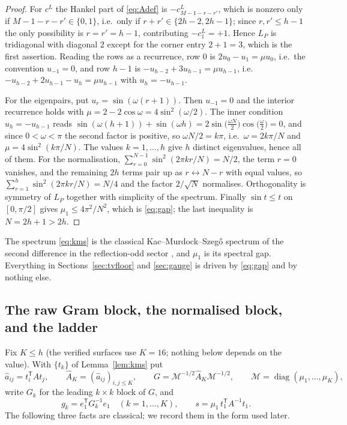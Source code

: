 \documentclass[11pt,a4paper]{article}
\theoremstyle{plain}
\theoremstyle{definition}
\newcommand{\T}{\mathsf{T}}
\newcommand{\Ah}{\widehat{A}}
\newcommand{\ah}{\widehat{a}}
\newcommand{\MM}{\mathcal{M}}
\DeclareMathOperator{\diag}{diag}
\begin{document}
\begin{proof}
For $c^{L}$ the Hankel part of \eqref{eq:Adef} is
$-c^{L}_{M-1-r-r'}$, which is nonzero only if $M-1-r-r'\in\{0,1\}$, i.e.\ only
if $r+r'\in\{2h-2,2h-1\}$; since $r,r'\le h-1$ the only possibility is
$r=r'=h-1$, contributing $-c^{L}_1=+1$. Hence $L_P$ is tridiagonal with
diagonal $2$ except for the corner entry $2+1=3$, which is the first assertion.
Reading the rows as a recurrence, row $0$ is $2u_0-u_1=\mu u_0$, i.e.\ the
convention $u_{-1}=0$, and row $h-1$ is $-u_{h-2}+3u_{h-1}=\mu u_{h-1}$, i.e.\
$-u_{h-2}+2u_{h-1}-u_h=\mu u_{h-1}$ with $u_h=-u_{h-1}$.

For the eigenpairs, put $u_r=\sin(\omega(r+1))$. Then $u_{-1}=0$ and the
interior recurrence holds with $\mu=2-2\cos\omega=4\sin^{2}(\omega/2)$. The
inner condition $u_h=-u_{h-1}$ reads
$\sin(\omega(h+1))+\sin(\omega h)=2\sin\bigl(\tfrac{\omega N}2\bigr)
\cos\bigl(\tfrac\omega2\bigr)=0$, and since $0<\omega<\pi$ the second factor is
positive, so $\omega N/2=k\pi$, i.e.\ $\omega=2k\pi/N$ and
$\mu=4\sin^{2}(k\pi/N)$. The values $k=1,\dots,h$ give $h$ distinct eigenvalues,
hence all of them. For the normalisation,
$\sum_{r=0}^{N-1}\sin^{2}(2\pi kr/N)=N/2$, the term $r=0$ vanishes, and the
remaining $2h$ terms pair up as $r\leftrightarrow N-r$ with equal values, so
$\sum_{r=1}^{h}\sin^{2}(2\pi kr/N)=N/4$ and the factor $2/\sqrt N$ normalises.
Orthogonality is symmetry of $L_P$ together with simplicity of the spectrum.
Finally $\sin t\le t$ on $[0,\pi/2]$ gives
$\mu_1\le4\pi^{2}/N^{2}$, which is \eqref{eq:gap}; the last inequality is
$N=2h+1>2h$.
\end{proof}

The spectrum \eqref{eq:kms} is the classical Kac--Murdock--Szeg\H{o} spectrum of
the second difference in the reflection-odd sector \cite{KMS1953}, and $\mu_1$
is its spectral gap. Everything in Sections~\ref{sec:tvfloor} and
\ref{sec:gauge} is driven by \eqref{eq:gap} and by nothing else.

\subsection{The raw Gram block, the normalised block, and the ladder}
\label{sec:gram}

Fix $K\le h$ (the verified surfaces use $K=16$; nothing below depends on the
value). With $\{t_k\}$ of Lemma~\ref{lem:kms} put
\begin{equation}
\label{eq:gram}
  \ah_{ij}=t_i^{\T}At_j,
  \qquad
  \Ah_K=(\ah_{ij})_{i,j\le K},
  \qquad
  G=\MM^{-1/2}\Ah_K\MM^{-1/2},
  \qquad \MM=\diag(\mu_1,\dots,\mu_K),
\end{equation}
write $G_k$ for the leading $k\times k$ block of $G$, and
\begin{equation}
\label{eq:ladder}
  g_k=e_1^{\T}G_k^{-1}e_1\quad(k=1,\dots,K),
  \qquad
  s=\mu_1\,t_1^{\T}A^{-1}t_1 .
\end{equation}
The following three facts are classical; we record them in the form used later.
\end{document}
